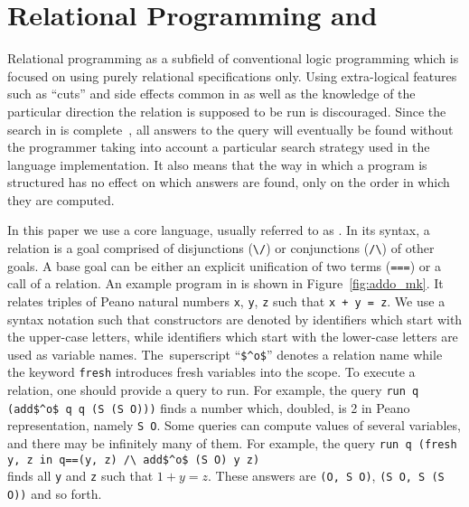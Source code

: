 \section{Relational Programming and \mk}
\label{sec:mk}













Relational programming as a subfield of conventional logic programming which is focused on using purely relational specifications only.
Using extra-logical features such as ``cuts'' and side effects common in \prolog as well as the knowledge of the particular direction the relation is supposed to be run is discouraged.
Since the search in \mk is complete~\cite{kiselyov2005backtracking,rozplokhas2020certified}, all answers to the query will eventually be found without the programmer taking into account a particular search strategy used in the language implementation.
It also means that the way in which a program is structured has no effect on which answers are found, only on the order in which they are computed.

In this paper we use a core \mk language, usually referred to as \micro.
In its syntax, a relation is a goal comprised of disjunctions (\lstinline{\/}) or conjunctions (\lstinline{/\}) of other goals.
A base goal can be either an explicit unification of two terms (\lstinline{===}) or a call of a relation.
An example program in \mk is shown in Figure~\ref{fig:addo_mk}.
It relates triples of Peano natural numbers \lstinline{x}, \lstinline{y}, \lstinline{z} such that \lstinline{x + y = z}.
We use a syntax notation such that constructors are denoted by identifiers which start with the upper-case letters, while identifiers which start with the lower-case letters are used as variable names.
The~superscript ``\lstinline{$^o$}'' denotes a relation name while the keyword \lstinline{fresh} introduces fresh variables into the scope.
To execute a relation, one should provide a query to run.
For example, the query \lstinline{run q (add$^o$ q q (S (S O)))} finds a number which, doubled, is 2 in Peano representation, namely \lstinline{S O}.
Some queries can compute values of several variables, and there may be infinitely many of them.
For example, the query \lstinline{run q (fresh y, z in q==(y, z) /\ add$^o$ (S O) y z)}
\\ finds all \lstinline{y} and \lstinline{z} such that $1 + y = z$.
These answers are \lstinline{(O, S O)}, \lstinline{(S O, S (S O))} and so forth.


